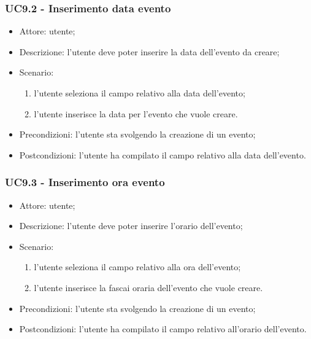 \subsubsection{UC9.2 - Inserimento data evento} \label{sec: UC9.2}
\begin{itemize}
    \item Attore: utente;
    \item Descrizione: l'utente deve poter inserire la data dell'evento da creare;
    \item Scenario:
        \begin{enumerate}
        \item l'utente seleziona il campo relativo alla data dell'evento;
        \item l'utente inserisce la data per l'evento che vuole creare.
        \end{enumerate}
    
    \item Precondizioni: l'utente sta svolgendo la creazione di un evento;
    \item Postcondizioni: l'utente ha compilato il campo relativo alla data dell'evento.
\end{itemize}


\subsubsection{UC9.3 - Inserimento ora evento} \label{sec: UC9.3}
\begin{itemize}
    \item Attore: utente;
    \item Descrizione: l'utente deve poter inserire l'orario dell'evento;
    \item Scenario:
        \begin{enumerate}
        \item l'utente seleziona il campo relativo alla ora dell'evento;
        \item l'utente inserisce la fascai oraria dell'evento che vuole creare.
        \end{enumerate}
    
    \item Precondizioni: l'utente sta svolgendo la creazione di un evento;
    \item Postcondizioni: l'utente ha compilato il campo relativo all'orario dell'evento.
\end{itemize}


